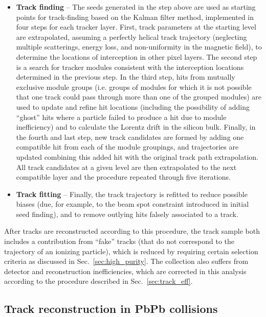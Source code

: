 \begin{itemize}
\item \textbf{Track finding} -- The seeds generated in the step above are used as starting points for track-finding based on the Kalman filter method, implemented in four steps for each tracker layer.  First, track parameters at the starting level are extrapolated, assuming a perfectly helical track trajectory (neglecting multiple scatterings, energy loss, and non-uniformity in the magnetic field), to determine the locations of interception in other pixel layers.  The second step is a search for tracker modules consistent with the interception locations determined in the previous step.  In the third step, hits from mutually exclusive module groups (i.e. groups of modules for which it is not possible that one track could pass through more than one of the grouped modules) are used to update and refine hit locations (including the possibility of adding ``ghost'' hits where a particle failed to produce a hit due to module inefficiency) and to calculate the Lorentz drift in the silicon bulk.  Finally, in the fourth and last step, new track candidates are formed by adding one compatible hit from each of the module groupings, and trajectories are updated combining this added hit with the original track path extrapolation.  All track candidates at a given level are then extrapolated to the next compatible layer and the procedure repeated through five iterations.

\item \textbf{Track fitting} -- Finally, the track trajectory is refitted to reduce possible biases (due, for example, to the beam spot constraint introduced in initial seed finding), and to remove outlying hits falsely associated to a track.  

\end{itemize}

\noindent After tracks are reconstructed according to this procedure, the track sample both includes a contribution from ``fake'' tracks (that do not correspond to the trajectory of an ionizing particle), which is reduced by requiring certain selection criteria as discussed in Sec.~\ref{sec:high_purity}.  The collection also suffers from detector and reconstruction inefficiencies, which are corrected in this analysis according to the procedure described in Sec.~\ref{sec:track_eff}.

\subsection{Track reconstruction in PbPb collisions}

